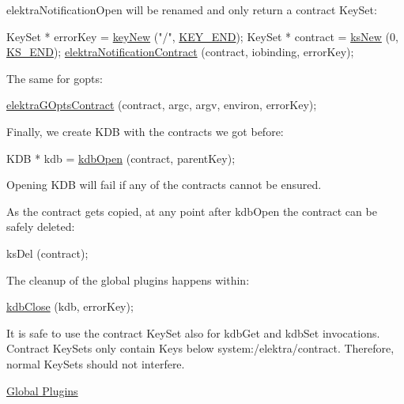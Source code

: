 {\ttfamily elektra\+Notification\+Open} will be renamed and only return a contract Key\+Set\+:


\begin{DoxyCode}
KeySet * errorKey = \hyperlink{group__key_gad23c65b44bf48d773759e1f9a4d43b89}{keyNew} (\textcolor{stringliteral}{"/"}, \hyperlink{group__key_gga9b703ca49f48b482def322b77d3e6bc8aa8adb6fcb92dec58fb19410eacfdd403}{KEY\_END});
KeySet * contract = \hyperlink{group__keyset_ga671e1aaee3ae9dc13b4834a4ddbd2c3c}{ksNew} (0, \hyperlink{group__keyset_ga7a28fce3773b2c873c94ac80b8b4cd54}{KS\_END});
\hyperlink{notification_8c_ad9290f444f315d3eac3f7cfdaf4efcda}{elektraNotificationContract} (contract, iobinding, errorKey);
\end{DoxyCode}


The same for gopts\+:


\begin{DoxyCode}
\hyperlink{contracts_8c_af4f606fc2179e917a10c77dab576d648}{elektraGOptsContract} (contract, argc, argv, environ, errorKey);
\end{DoxyCode}


Finally, we create {\ttfamily K\+DB} with the contracts we got before\+:


\begin{DoxyCode}
KDB * kdb = \hyperlink{group__kdb_ga844e1299a84c3fbf1d3a905c5c893ba5}{kdbOpen} (contract, parentKey);
\end{DoxyCode}


Opening {\ttfamily K\+DB} will fail if any of the contracts cannot be ensured.

As the {\ttfamily contract} gets copied, at any point after {\ttfamily kdb\+Open} the contract can be safely deleted\+:


\begin{DoxyCode}
ksDel (contract);
\end{DoxyCode}


The cleanup of the global plugins happens within\+:


\begin{DoxyCode}
\hyperlink{group__kdb_gadb54dc9fda17ee07deb9444df745c96f}{kdbClose} (kdb, errorKey);
\end{DoxyCode}


It is safe to use the contract {\ttfamily Key\+Set} also for {\ttfamily kdb\+Get} and {\ttfamily kdb\+Set} invocations. Contract {\ttfamily Key\+Set}s only contain {\ttfamily Key}s below {\ttfamily system\+:/elektra/contract}. Therefore, normal {\ttfamily Key\+Set}s should not interfere.


\begin{DoxyItemize}
\item \hyperlink{doc_decisions_global_plugins_md}{Global Plugins}
\end{DoxyItemize}